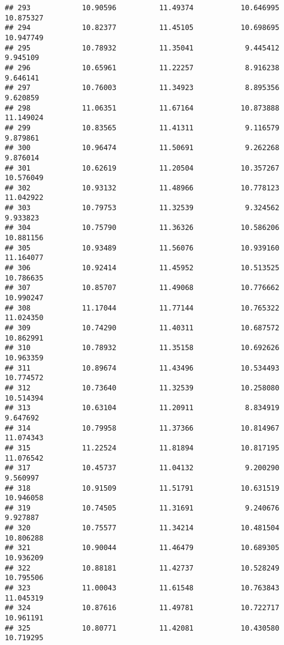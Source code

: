 \documentclass[
]{article}
\begin{document}
\begin{verbatim}
## 293            10.90596          11.49374           10.646995         10.875327
## 294            10.82377          11.45105           10.698695         10.947749
## 295            10.78932          11.35041            9.445412          9.945109
## 296            10.65961          11.22257            8.916238          9.646141
## 297            10.76003          11.34923            8.895356          9.620859
## 298            11.06351          11.67164           10.873888         11.149024
## 299            10.83565          11.41311            9.116579          9.879861
## 300            10.96474          11.50691            9.262268          9.876014
## 301            10.62619          11.20504           10.357267         10.576049
## 302            10.93132          11.48966           10.778123         11.042922
## 303            10.79753          11.32539            9.324562          9.933823
## 304            10.75790          11.36326           10.586206         10.881156
## 305            10.93489          11.56076           10.939160         11.164077
## 306            10.92414          11.45952           10.513525         10.786635
## 307            10.85707          11.49068           10.776662         10.990247
## 308            11.17044          11.77144           10.765322         11.024350
## 309            10.74290          11.40311           10.687572         10.862991
## 310            10.78932          11.35158           10.692626         10.963359
## 311            10.89674          11.43496           10.534493         10.774572
## 312            10.73640          11.32539           10.258080         10.514394
## 313            10.63104          11.20911            8.834919          9.647692
## 314            10.79958          11.37366           10.814967         11.074343
## 315            11.22524          11.81894           10.817195         11.076542
## 317            10.45737          11.04132            9.200290          9.560997
## 318            10.91509          11.51791           10.631519         10.946058
## 319            10.74505          11.31691            9.240676          9.927887
## 320            10.75577          11.34214           10.481504         10.806288
## 321            10.90044          11.46479           10.689305         10.936209
## 322            10.88181          11.42737           10.528249         10.795506
## 323            11.00043          11.61548           10.763843         11.045319
## 324            10.87616          11.49781           10.722717         10.961191
## 325            10.80771          11.42081           10.430580         10.719295

\end{verbatim}
\end{document}
